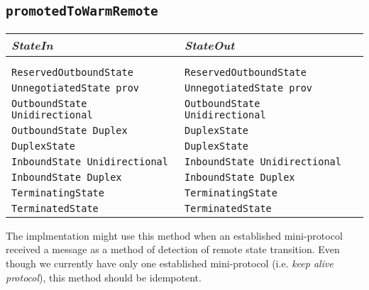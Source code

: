 \documentclass{article}
\def\InitialState{\textbullet}
\def\ReservedOutboundState{\texttt{ReservedOutboundState}}
\def\UnnegotiatedStateAny{\texttt{UnnegotiatedState prov}}
\def\OutboundStateUni{\texttt{OutboundState Unidirectional}}
\def\OutboundStateDup{\texttt{OutboundState Duplex}}
\def\DuplexState{\texttt{DuplexState}}
\def\InboundStateUni{\texttt{InboundState Unidirectional}}
\def\InboundStateDup{\texttt{InboundState Duplex}}
\def\TerminatingState{\texttt{TerminatingState}}
\def\TerminatedState{\texttt{TerminatedState}}
\begin{document}
\subsection{\texttt{promotedToWarmRemote}}
\begin{center}
  \begin{tabular}[h]{lll}
    \textit{StateIn}         & \textit{StateOut}\\\hline\\[2pt]
    \InitialState{}          & \InitialState{}          \\[8pt]
    \ReservedOutboundState{} & \ReservedOutboundState{} \\[8pt]
    \UnnegotiatedStateAny{}  & \UnnegotiatedStateAny{}  \\[8pt]
    \OutboundStateUni{}      & \OutboundStateUni{}      \\[8pt]
    \OutboundStateDup{}      & \DuplexState{}           \\[8pt]
    \DuplexState{}           & \DuplexState{}           \\[8pt]
    \InboundStateUni{}       & \InboundStateUni{}       \\[8pt]
    \InboundStateDup{}       & \InboundStateDup{}       \\[8pt]
    \TerminatingState{}      & \TerminatingState{}      \\[8pt]
    \TerminatedState{}       & \TerminatedState{}       \\[8pt]
  \end{tabular}
\end{center}
The implmentation might use this method when an established mini-protocol
received a message as a method of detection of remote state transition.  Even
though we currently have only one established mini-protocol (i.e. \textit{keep
alive protocol}),  this method should be idempotent.



\end{document}
